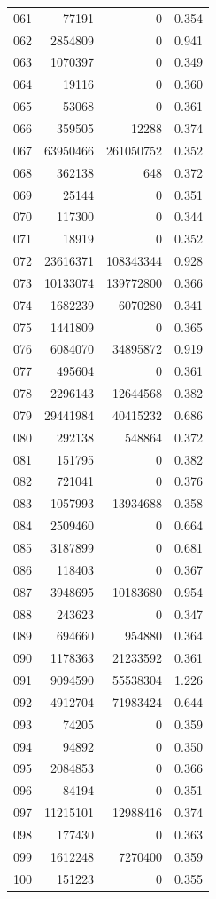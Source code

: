 \documentclass[anonymous,notoc]{gmcm2026}
\begin{document}
\begin{longtable}{lrrr}
061 & 77191 & 0 & 0.354 \\
062 & 2854809 & 0 & 0.941 \\
063 & 1070397 & 0 & 0.349 \\
064 & 19116 & 0 & 0.360 \\
065 & 53068 & 0 & 0.361 \\
066 & 359505 & 12288 & 0.374 \\
067 & 63950466 & 261050752 & 0.352 \\
068 & 362138 & 648 & 0.372 \\
069 & 25144 & 0 & 0.351 \\
070 & 117300 & 0 & 0.344 \\
071 & 18919 & 0 & 0.352 \\
072 & 23616371 & 108343344 & 0.928 \\
073 & 10133074 & 139772800 & 0.366 \\
074 & 1682239 & 6070280 & 0.341 \\
075 & 1441809 & 0 & 0.365 \\
076 & 6084070 & 34895872 & 0.919 \\
077 & 495604 & 0 & 0.361 \\
078 & 2296143 & 12644568 & 0.382 \\
079 & 29441984 & 40415232 & 0.686 \\
080 & 292138 & 548864 & 0.372 \\
081 & 151795 & 0 & 0.382 \\
082 & 721041 & 0 & 0.376 \\
083 & 1057993 & 13934688 & 0.358 \\
084 & 2509460 & 0 & 0.664 \\
085 & 3187899 & 0 & 0.681 \\
086 & 118403 & 0 & 0.367 \\
087 & 3948695 & 10183680 & 0.954 \\
088 & 243623 & 0 & 0.347 \\
089 & 694660 & 954880 & 0.364 \\
090 & 1178363 & 21233592 & 0.361 \\
091 & 9094590 & 55538304 & 1.226 \\
092 & 4912704 & 71983424 & 0.644 \\
093 & 74205 & 0 & 0.359 \\
094 & 94892 & 0 & 0.350 \\
095 & 2084853 & 0 & 0.366 \\
096 & 84194 & 0 & 0.351 \\
097 & 11215101 & 12988416 & 0.374 \\
098 & 177430 & 0 & 0.363 \\
099 & 1612248 & 7270400 & 0.359 \\
100 & 151223 & 0 & 0.355 \\
\end{longtable}
\end{document}
